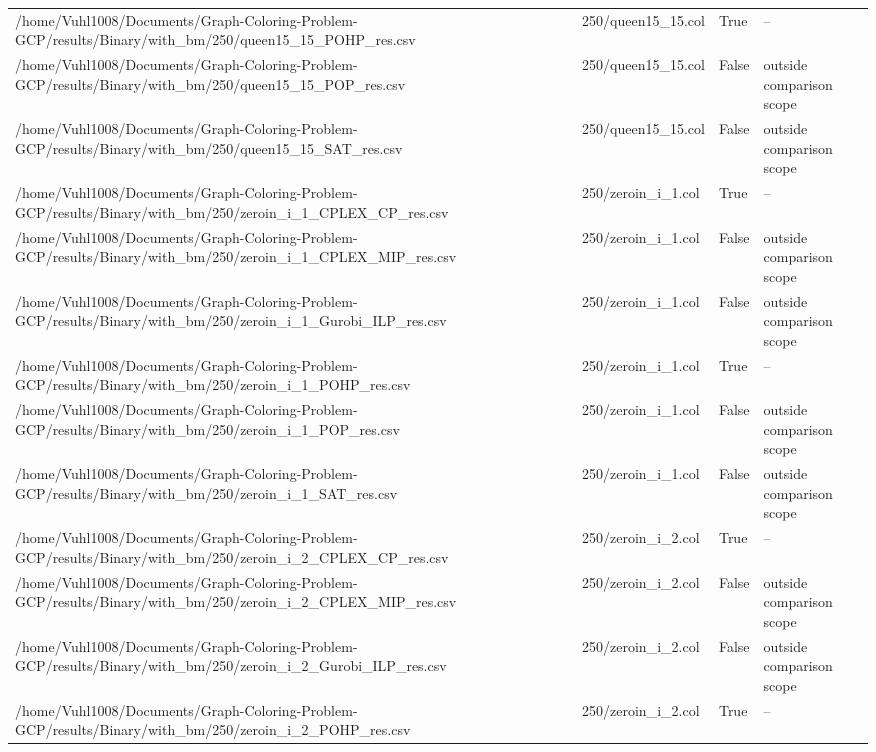 \begin{table}[htbp]
\begin{tabular}{llll}
/home/Vuhl1008/Documents/Graph-Coloring-Problem-GCP/results/Binary/with\_bm/250/queen15\_15\_POHP\_res.csv & 250/queen15\_15.col & True & -- \\
/home/Vuhl1008/Documents/Graph-Coloring-Problem-GCP/results/Binary/with\_bm/250/queen15\_15\_POP\_res.csv & 250/queen15\_15.col & False & outside comparison scope \\
/home/Vuhl1008/Documents/Graph-Coloring-Problem-GCP/results/Binary/with\_bm/250/queen15\_15\_SAT\_res.csv & 250/queen15\_15.col & False & outside comparison scope \\
/home/Vuhl1008/Documents/Graph-Coloring-Problem-GCP/results/Binary/with\_bm/250/zeroin\_i\_1\_CPLEX\_CP\_res.csv & 250/zeroin\_i\_1.col & True & -- \\
/home/Vuhl1008/Documents/Graph-Coloring-Problem-GCP/results/Binary/with\_bm/250/zeroin\_i\_1\_CPLEX\_MIP\_res.csv & 250/zeroin\_i\_1.col & False & outside comparison scope \\
/home/Vuhl1008/Documents/Graph-Coloring-Problem-GCP/results/Binary/with\_bm/250/zeroin\_i\_1\_Gurobi\_ILP\_res.csv & 250/zeroin\_i\_1.col & False & outside comparison scope \\
/home/Vuhl1008/Documents/Graph-Coloring-Problem-GCP/results/Binary/with\_bm/250/zeroin\_i\_1\_POHP\_res.csv & 250/zeroin\_i\_1.col & True & -- \\
/home/Vuhl1008/Documents/Graph-Coloring-Problem-GCP/results/Binary/with\_bm/250/zeroin\_i\_1\_POP\_res.csv & 250/zeroin\_i\_1.col & False & outside comparison scope \\
/home/Vuhl1008/Documents/Graph-Coloring-Problem-GCP/results/Binary/with\_bm/250/zeroin\_i\_1\_SAT\_res.csv & 250/zeroin\_i\_1.col & False & outside comparison scope \\
/home/Vuhl1008/Documents/Graph-Coloring-Problem-GCP/results/Binary/with\_bm/250/zeroin\_i\_2\_CPLEX\_CP\_res.csv & 250/zeroin\_i\_2.col & True & -- \\
/home/Vuhl1008/Documents/Graph-Coloring-Problem-GCP/results/Binary/with\_bm/250/zeroin\_i\_2\_CPLEX\_MIP\_res.csv & 250/zeroin\_i\_2.col & False & outside comparison scope \\
/home/Vuhl1008/Documents/Graph-Coloring-Problem-GCP/results/Binary/with\_bm/250/zeroin\_i\_2\_Gurobi\_ILP\_res.csv & 250/zeroin\_i\_2.col & False & outside comparison scope \\
/home/Vuhl1008/Documents/Graph-Coloring-Problem-GCP/results/Binary/with\_bm/250/zeroin\_i\_2\_POHP\_res.csv & 250/zeroin\_i\_2.col & True & -- \\

\end{tabular}
\end{table}
